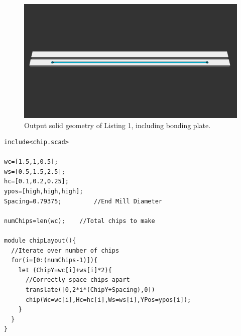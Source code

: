 \begin{figure}[htb]
  \begin{minipage}[t]{0.99\linewidth}\centering
    \includegraphics[width=14cm]{PaperExampleListing1}
  \end{minipage}\hfill
  \caption[Output single solid geometry]{Output solid geometry of Listing 1, including bonding plate.}
  \label{fig:listing1}
\end{figure}

\begin{minipage}{0.95\linewidth}
\begin{lstlisting}[caption={The single line of code in Listing \ref{lst:chip} can then be iterated upon to form an array of different device geometries that can be sent directly to a CAM tool for toolpath generation}, label={lst:chipLayout}, frame=single, language=scad]
include<chip.scad>

wc=[1.5,1,0.5];		 
ws=[0.5,1.5,2.5];
hc=[0.1,0.2,0.25];
ypos=[high,high,high];
Spacing=0.79375;         //End Mill Diameter

numChips=len(wc);	 //Total chips to make

module chipLayout(){
  //Iterate over number of chips
  for(i=[0:(numChips-1)]){
    let (ChipY=wc[i]+ws[i]*2){
      //Correctly space chips apart
      translate([0,2*i*(ChipY+Spacing),0])
      chip(Wc=wc[i],Hc=hc[i],Ws=ws[i],YPos=ypos[i]);
    }
  }
}
\end{lstlisting}
\end{minipage}


